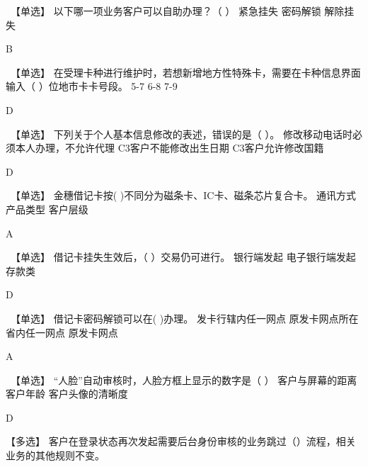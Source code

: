 \documentclass[kindlepaper]{BHCexam4kindle}
\begin{document}
\begin{questions}
\qs　【单选】 以下哪一项业务客户可以自助办理？（  ） \xx
{} {  紧急挂失 } { 密码解锁 } { 解除挂失 }
\begin{solution} B \end{solution}
\qs　【单选】 在受理卡种进行维护时，若想新增地方性特殊卡，需要在卡种信息界面输入（ ）位地市卡卡号段。 \xx
{} {  5-7 } { 6-8 } { 7-9 }
\begin{solution} D \end{solution}
\qs　【单选】 下列关于个人基本信息修改的表述，错误的是（  ）。 \xx
{} {  修改移动电话时必须本人办理，不允许代理 } { C3客户不能修改出生日期 } { C3客户允许修改国籍 }
\begin{solution} D \end{solution}
\qs　【单选】 金穗借记卡按(    )不同分为磁条卡、IC卡、磁条芯片复合卡。 \xx
{} {  通讯方式 } { 产品类型 } { 客户层级 }
\begin{solution} A \end{solution}
\qs　【单选】 借记卡挂失生效后，（    ）交易仍可进行。 \xx
{} {  银行端发起 } { 电子银行端发起  } { 存款类 }
\begin{solution} D \end{solution}
\qs　【单选】 借记卡密码解锁可以在(    )办理。 \xx
{} {  发卡行辖内任一网点 } { 原发卡网点所在省内任一网点 } { 原发卡网点 }
\begin{solution} A \end{solution}
\qs　【单选】 “人脸”自动审核时，人脸方框上显示的数字是（  ） \xx
{} {  客户与屏幕的距离 } { 客户年龄 } { 客户头像的清晰度 }
\begin{solution} D \end{solution}
\qs 【多选】 客户在登录状态再次发起需要后台身份审核的业务跳过（）流程，相关业务的其他规则不变。 \xx

\end{questions}
\end{document}
